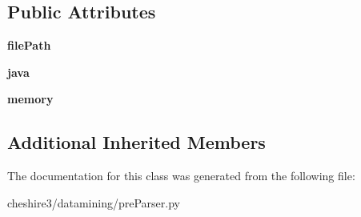 \subsection*{Public Attributes}
\begin{DoxyCompactItemize}
\item 
\hypertarget{classcheshire3_1_1datamining_1_1pre_parser_1_1_t_f_p_pre_parser_aa19f6c0024fbcc3d70018634d05638da}{{\bfseries file\-Path}}\label{classcheshire3_1_1datamining_1_1pre_parser_1_1_t_f_p_pre_parser_aa19f6c0024fbcc3d70018634d05638da}

\item 
\hypertarget{classcheshire3_1_1datamining_1_1pre_parser_1_1_t_f_p_pre_parser_af11edec780d2b1578193433785a04d3f}{{\bfseries java}}\label{classcheshire3_1_1datamining_1_1pre_parser_1_1_t_f_p_pre_parser_af11edec780d2b1578193433785a04d3f}

\item 
\hypertarget{classcheshire3_1_1datamining_1_1pre_parser_1_1_t_f_p_pre_parser_a41fa6a19154f69701e3d59a37311fc1d}{{\bfseries memory}}\label{classcheshire3_1_1datamining_1_1pre_parser_1_1_t_f_p_pre_parser_a41fa6a19154f69701e3d59a37311fc1d}

\end{DoxyCompactItemize}
\subsection*{Additional Inherited Members}


The documentation for this class was generated from the following file\-:\begin{DoxyCompactItemize}
\item 
cheshire3/datamining/pre\-Parser.\-py\end{DoxyCompactItemize}

